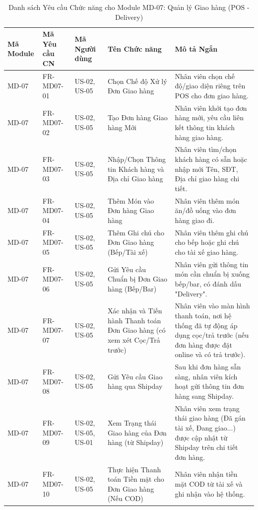 \begin{longtable}{|m{2cm}|m{2.5cm}|m{2.5cm}|m{4.5cm}|m{4cm}|}
\caption{Danh sách Yêu cầu Chức năng cho Module MD-07: Quản lý Giao hàng (POS - Delivery)} \label{tab:fr_md07_revised_v2} \\
\hline
\textbf{Mã Module} & \textbf{Mã Yêu cầu CN} & \textbf{Mã Người dùng} & \textbf{Tên Chức năng} & \textbf{Mô tả Ngắn} \\
\hline
\endhead %
\hline
\endfoot %
\hline
\endlastfoot %

MD-07 & FR-MD07-01 & US-02, US-05 & Chọn Chế độ Xử lý Đơn Giao hàng & Nhân viên chọn chế độ/giao diện riêng trên POS cho đơn giao hàng. \\
\hline
MD-07 & FR-MD07-02 & US-02, US-05 & Tạo Đơn hàng Giao hàng Mới & Nhân viên khởi tạo đơn hàng mới, yêu cầu liên kết thông tin khách hàng giao hàng. \\
\hline
MD-07 & FR-MD07-03 & US-02, US-05 & Nhập/Chọn Thông tin Khách hàng và Địa chỉ Giao hàng & Nhân viên tìm/chọn khách hàng có sẵn hoặc nhập mới Tên, SĐT, Địa chỉ giao hàng chi tiết. \\
\hline
MD-07 & FR-MD07-04 & US-02, US-05 & Thêm Món vào Đơn hàng Giao hàng & Nhân viên thêm món ăn/đồ uống vào đơn hàng giao đi. \\
\hline
MD-07 & FR-MD07-05 & US-02, US-05 & Thêm Ghi chú cho Đơn Giao hàng (Bếp/Tài xế) & Nhân viên thêm ghi chú cho bếp hoặc ghi chú cho tài xế giao hàng. \\
\hline
MD-07 & FR-MD07-06 & US-02, US-05 & Gửi Yêu cầu Chuẩn bị Đơn Giao hàng (Bếp/Bar) & Nhân viên gửi thông tin món cần chuẩn bị xuống bếp/bar, có đánh dấu "Delivery". \\
\hline
MD-07 & FR-MD07-07 & US-02, US-05 & Xác nhận và Tiến hành Thanh toán Đơn Giao hàng (có xem xét Cọc/Trả trước) & Nhân viên vào màn hình thanh toán, nơi hệ thống đã tự động áp dụng cọc/trả trước (nếu đơn hàng được đặt online và có trả trước). \\
\hline
MD-07 & FR-MD07-08 & US-02, US-05 & Gửi Yêu cầu Giao hàng qua Shipday & Sau khi đơn hàng sẵn sàng, nhân viên kích hoạt gửi thông tin đơn hàng sang Shipday. \\
\hline
MD-07 & FR-MD07-09 & US-02, US-05, US-01 & Xem Trạng thái Giao hàng của Đơn hàng (từ Shipday) & Nhân viên xem trạng thái giao hàng (Đã gán tài xế, Đang giao...) được cập nhật từ Shipday trên chi tiết đơn hàng. \\
\hline
MD-07 & FR-MD07-10 & US-02, US-05 & Thực hiện Thanh toán Tiền mặt cho Đơn Giao hàng (Nếu COD) & Nhân viên nhận tiền mặt COD từ tài xế và ghi nhận vào hệ thống. \\

\end{longtable}
